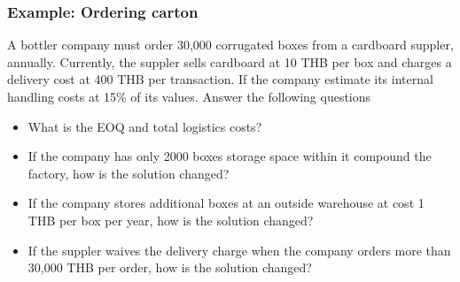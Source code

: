 \documentclass[10pt,handout,notes=show]{beamer}
\begin{document}
  \begin{frame}
  \frametitle{Example: Ordering carton}

  \small{A bottler company must order 30,000 corrugated boxes from a cardboard suppler, annually. Currently, the suppler sells cardboard at 10 THB per box and charges a delivery cost at 400 THB per transaction.
  If the company estimate its internal handling costs at 15\% of its values. Answer the following questions

  \begin{itemize}
    \item[a] What is the EOQ and total logistics costs?
    \item[b] If the company has only 2000 boxes storage space within it compound the factory, how is the solution changed?
    \item[c] If the company stores additional boxes at an outside warehouse at cost 1 THB per box per year, how is the solution changed?
    \item[d] If the suppler waives the delivery charge when the company orders more than 30,000 THB per order, how is the solution changed?
  \end{itemize}
  }

  \end{frame}
\end{document}
